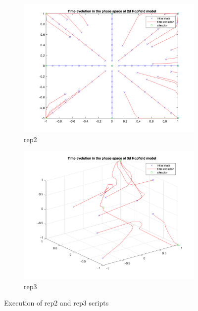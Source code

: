 \documentclass[11pt,conference,compsoc]{IEEEtran}
\begin{document}
\begin{figure}[]
        \centering
        \begin{subfigure}{0.33\linewidth}
            \includegraphics[width=\linewidth]{images/hopfield1_rep2.png}
            \caption{rep2}
        \end{subfigure}
        \begin{subfigure}{0.33\linewidth}
            \includegraphics[width=\linewidth]{images/hopfield1_rep3.png}
            \caption{rep3}
        \end{subfigure}
        \caption{Execution of rep2 and rep3 scripts}
        \label{fig:6}
\end{figure}
\end{document}
